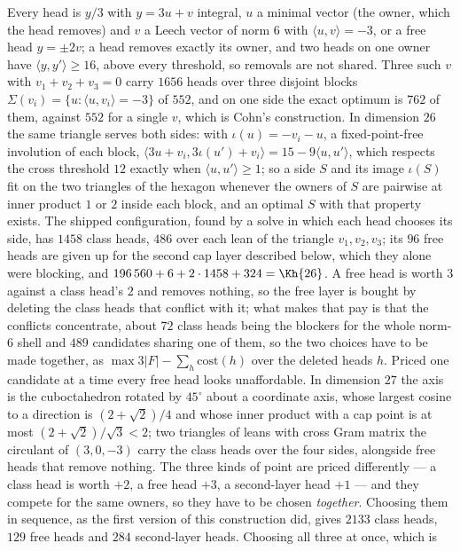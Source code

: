 \documentclass[11pt]{amsart}
\theoremstyle{remark}
\newcommand{\ip}[2]{\langle #1,#2\rangle}
\begin{document}
Every head is $y/3$ with $y=3u+v$ integral, $u$ a minimal vector (the owner,
which the head removes) and $v$ a Leech vector of norm $6$ with $\ip{u}{v}=-3$,
or a free head $y=\pm2v$; a head removes exactly its owner, and two heads on one
owner have $\ip{y}{y'}\ge16$, above every threshold, so removals are not shared.
Three such $v$ with $v_{1}+v_{2}+v_{3}=0$ carry $1656$ heads over three
disjoint blocks $\Sigma(v_{i})=\{u:\ip{u}{v_{i}}=-3\}$ of $552$, and on one side
the exact optimum is $762$ of them, against $552$ for a single $v$, which is
Cohn's construction. In dimension $26$ the same triangle serves both sides: with
$\iota(u)=-v_{i}-u$, a fixed-point-free involution of each block,
$\ip{3u+v_{i}}{3\iota(u')+v_{i}}=15-9\ip{u}{u'}$, which respects the cross
threshold $12$ exactly when $\ip{u}{u'}\ge1$; so a side $S$ and its image
$\iota(S)$ fit on the two triangles of the hexagon whenever the owners of $S$ are
pairwise at inner product $1$ or $2$ inside each block, and an optimal $S$ with
that property exists. The shipped configuration, found by a solve in which each
head chooses its side, has $1458$ class heads, $486$ over each lean of the
triangle $v_1,v_2,v_3$; its $96$ free heads are given up for the second cap layer described
below, which they alone were blocking, and
$196\,560+6+2\cdot1458+324=\Kh{26}$.  A free head is worth $3$ against a
class head's $2$ and removes nothing, so the free layer is bought by deleting the
class heads that conflict with it; what makes that pay is that the conflicts
concentrate, about $72$ class heads being the blockers for the whole norm-$6$
shell and $489$ candidates sharing one of them, so the two choices have to be made
together, as $\max 3\lvert F\rvert-\sum_{h}\mathrm{cost}(h)$ over the deleted
heads $h$.  Priced one candidate at a time every free head looks unaffordable. In dimension $27$ the axis is
the cuboctahedron rotated by $45^{\circ}$ about a coordinate axis, whose largest
cosine to a direction is $(2+\sqrt2)/4$ and whose inner product with a cap point
is at most $(2+\sqrt2)/\sqrt3<2$; two triangles of leans with cross Gram matrix
the circulant of $(3,0,-3)$ carry the class heads over the four sides, alongside
free heads that remove nothing. The three kinds of point are priced differently --- a class head is worth
$+2$, a free head $+3$, a second-layer head $+1$ --- and they compete for the same
owners, so they have to be chosen \emph{together}. Choosing them in sequence, as
the first version of this construction did, gives $2133$ class heads, $129$ free
heads and $284$ second-layer heads. Choosing all three at once, which is
\end{document}
